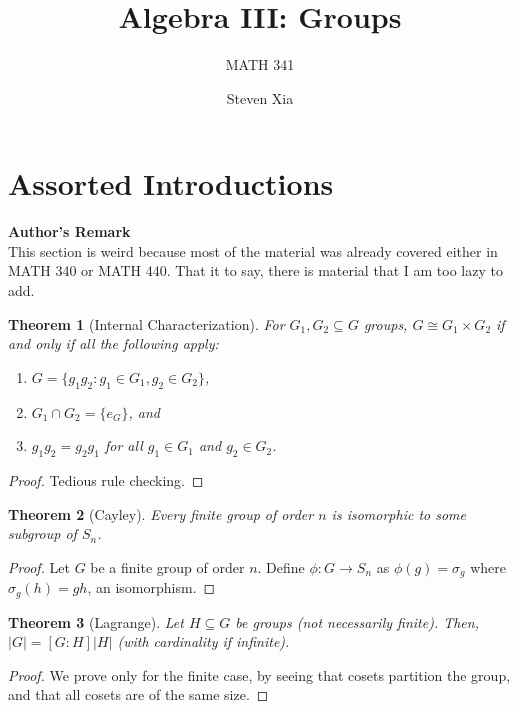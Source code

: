 \documentclass[
    parskip=half,
    toc=flat,
    toc=sectionentrydotfill,
]{scrartcl}  %
\title{Algebra III: Groups}
\subtitle{MATH 341}
\author{Steven Xia}
\theoremstyle{definition}
\theoremstyle{plain}
\newtheorem{theorem}{Theorem}[section]
\theoremstyle{remark}
\begin{document}
\maketitle
\tableofcontents


\section{Assorted Introductions}

\begin{center}
    \textbf{Author's Remark}\\
    This section is weird because most of the material was already covered either in MATH 340 or MATH 440.
    That it to say, there is material that I am too lazy to add.
\end{center}

\begin{theorem}[Internal Characterization]
    For $G_1,G_2\subseteq G$ groups, $G\cong G_1\times G_2$ if and only if all the following apply:
    \begin{enumerate}[nosep]
        \item $G=\{g_1g_2:g_1\in G_1,g_2\in G_2\}$,
        \item $G_1\cap G_2=\{e_G\}$, and
        \item $g_1g_2=g_2g_1$ for all $g_1\in G_1$ and $g_2\in G_2$.
    \end{enumerate}
\end{theorem}

\begin{proof}
    Tedious rule checking.
\end{proof}

\begin{theorem}[Cayley]
    Every finite group of order $n$ is isomorphic to some subgroup of $S_n$.
\end{theorem}

\begin{proof}
    Let $G$ be a finite group of order $n$.
    Define $\phi:G\to S_n$ as $\phi(g)=\sigma_g$ where $\sigma_g(h)=gh$, an isomorphism.
\end{proof}

\begin{theorem}[Lagrange]
    Let $H\subseteq G$ be groups (not necessarily finite).
    Then, $|G|=[G:H]|H|$ (with cardinality if infinite).
\end{theorem}

\begin{proof}
    We prove only for the finite case, by seeing that cosets partition the group, and that all cosets are of the same
    size.
\end{proof}
\end{document}
